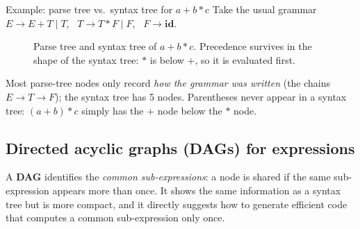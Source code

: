 \documentclass[11pt,a4paper]{article}
\begin{document}
\begin{examplebox}{Example: parse tree vs.\ syntax tree for $a + b * c$}
Take the usual grammar $E \to E + T \mid T$, \ $T \to T * F \mid F$, \ $F \to \mathbf{id}$.

\begin{figure}[H]
\centering
{}
\caption{Parse tree and syntax tree of $a+b*c$. Precedence survives in the shape of the syntax tree: $*$ is below $+$, so it is evaluated first.}
\end{figure}

Most parse-tree nodes only record \emph{how the grammar was written} (the chains $E\to T\to F$); the syntax tree has 5 nodes. Parentheses never appear in a syntax tree: $(a+b)*c$ simply has the $+$ node below the $*$ node.
\end{examplebox}

\subsection{Directed acyclic graphs (DAGs) for expressions}
A \textbf{DAG} identifies the \emph{common sub-expressions}: a node is shared if the same sub-expression appears more than once. It shows the same information as a syntax tree but is more compact, and it directly suggests how to generate efficient code that computes a common sub-expression only once.
\end{document}
